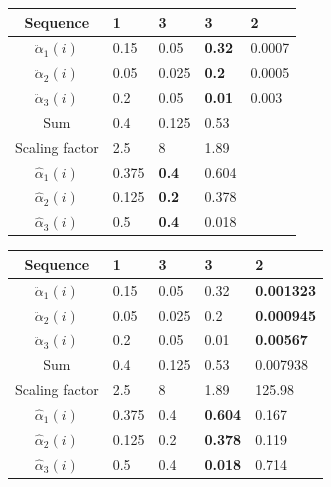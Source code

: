 \begin{frame}[noframenumbering]
\begin{table}[h]
\begin{tabular}{|c|l|l|l|l|}
 \hline
Sequence      & 1     & 3            & 3             & 2      \\ \hline
$\ddot{\alpha}_1(i)$          & 0.15  & 0.05         & \textbf{0.32} & 0.0007 \\ \hline
$\ddot{\alpha}_2(i)$          & 0.05  & 0.025        & \textbf{0.2}  & 0.0005 \\ \hline
$\ddot{\alpha}_3(i)$          & 0.2   & 0.05         & \textbf{0.01} & 0.003  \\ \hline
Sum            & 0.4   & 0.125        & 0.53          &        \\ \hline
Scaling factor & 2.5   & 8            & 1.89          &        \\ \hline
$\hat{\alpha}_1(i)$          & 0.375 & \textbf{0.4} & 0.604         &        \\ \hline
$\hat{\alpha}_2(i)$          & 0.125 & \textbf{0.2} & 0.378         &        \\ \hline
$\hat{\alpha}_3(i)$          & 0.5   & \textbf{0.4} & 0.018         &   	   \\ \hline    
\end{tabular}
\end{table}
\end{frame}

\begin{frame}[noframenumbering]
\begin{table}[h]
\begin{tabular}{|c|l|l|l|l|}
\hline
Sequence      & 1     & 3     & 3              & 2                 \\ \hline
$\ddot{\alpha}_1(i)$          & 0.15  & 0.05  & 0.32           & \textbf{0.001323} \\ \hline
$\ddot{\alpha}_2(i)$          & 0.05  & 0.025 & 0.2            & \textbf{0.000945} \\ \hline
$\ddot{\alpha}_3(i)$          & 0.2   & 0.05  & 0.01           & \textbf{0.00567}  \\ \hline
Sum            & 0.4   & 0.125 & 0.53           & 0.007938          \\ \hline
Scaling factor & 2.5   & 8     & 1.89           & 125.98            \\ \hline
$\hat{\alpha}_1(i)$          & 0.375 & 0.4   & \textbf{0.604} & 0.167             \\ \hline
$\hat{\alpha}_2(i)$          & 0.125 & 0.2   & \textbf{0.378} & 0.119             \\ \hline
$\hat{\alpha}_3(i)$          & 0.5   & 0.4   & \textbf{0.018} & 0.714             \\ \hline  
\end{tabular}
\end{table}
\end{frame}